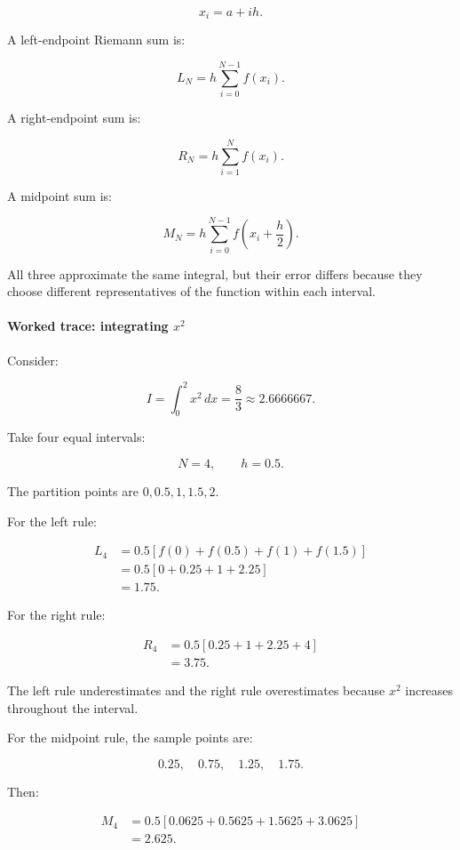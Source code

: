 \[
x_i=a+ih.
\]

A left-endpoint Riemann sum is:

\[
L_N=h\sum_{i=0}^{N-1}f(x_i).
\]

A right-endpoint sum is:

\[
R_N=h\sum_{i=1}^{N}f(x_i).
\]

A midpoint sum is:

\[
M_N=h\sum_{i=0}^{N-1}f\left(x_i+\frac h2\right).
\]

All three approximate the same integral, but their error differs because they choose different representatives of the function within each interval.

\paragraph{\texorpdfstring{Worked trace: integrating \(x^2\)}{Worked trace: integrating x\^{}2}}\label{02-foundations-ii-ch022-worked-trace-integrating-x2}

\hypertarget{02-foundations-ii-ch022-worked-trace-integrating-x2}{}

Consider:

\[
I=\int_0^2x^2\,dx=\frac83\approx2.6666667.
\]

Take four equal intervals:

\[
N=4,\qquad h=0.5.
\]

The partition points are \(0,0.5,1,1.5,2\).

For the left rule:

\[
\begin{aligned} L_4 &=0.5[f(0)+f(0.5)+f(1)+f(1.5)]\\ &=0.5[0+0.25+1+2.25]\\ &=\boxed{1.75}. \end{aligned}
\]

For the right rule:

\[
\begin{aligned} R_4 &=0.5[0.25+1+2.25+4]\\ &=\boxed{3.75}. \end{aligned}
\]

The left rule underestimates and the right rule overestimates because \(x^2\) increases throughout the interval.

For the midpoint rule, the sample points are:

\[
0.25,\quad0.75,\quad1.25,\quad1.75.
\]

Then:

\[
\begin{aligned} M_4 &=0.5[0.0625+0.5625+1.5625+3.0625]\\ &=\boxed{2.625}. \end{aligned}
\]

